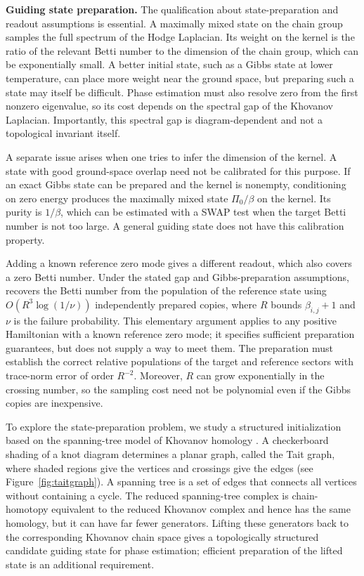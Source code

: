 \documentclass[a4paper,onecolumn,unpublished]{quantumarticle}
\theoremstyle{plain}
\theoremstyle{definition}
\theoremstyle{definition}
\numberwithin{equation}{section}
\begin{document}
\noindent \textbf{Guiding state preparation.}
The qualification about state-preparation and readout assumptions is essential.  A maximally mixed state on the chain group samples the full spectrum of the Hodge Laplacian.    Its weight on the kernel is the ratio of the relevant Betti number to the dimension of the chain group, which can be exponentially small.  A better initial state, such as a Gibbs state at lower temperature, can place more weight near the ground space, but preparing such a state may itself be difficult.  Phase estimation must also resolve zero from the first nonzero eigenvalue, so its cost depends on the spectral gap of the Khovanov Laplacian. Importantly, this spectral gap is diagram-dependent and not a topological invariant itself.

A separate issue arises when one tries to infer the dimension of the kernel.  A state with good ground-space overlap need not be calibrated for this purpose.  If an exact Gibbs state can be prepared and the kernel is nonempty, conditioning on zero energy produces the maximally mixed state \(\Pi_0/\beta\) on the kernel.  Its purity is \(1/\beta\), which can be estimated with a SWAP test when the target Betti number is not too large.  A general guiding state does not have this calibration property.

Adding a known reference zero mode gives a different readout, which also covers a zero Betti number. Under the stated gap and Gibbs-preparation assumptions,  recovers the Betti number from the population of the reference state using $O(R^3\log(1/\nu))$ independently prepared copies, where $R$ bounds $\beta_{i,j}+1$ and $\nu$ is the failure probability. This elementary argument applies to any positive Hamiltonian with a known reference zero mode; it specifies sufficient preparation guarantees, but does not supply a way to meet them. The preparation must establish the correct relative populations of the target and reference sectors with trace-norm error of order $R^{-2}$. Moreover, $R$ can grow exponentially in the crossing number, so the sampling cost need not be polynomial even if the Gibbs copies are inexpensive.  

To explore the state-preparation problem, we study a structured initialization based on the spanning-tree model of Khovanov homology \cite{wehrli2004spanningtree,champanerkar2008spanningtrees}.  A checkerboard shading of a knot diagram determines a planar graph, called the Tait graph, where shaded regions give the vertices and crossings give the edges (see Figure~\ref{fig:taitgraph}).  A spanning tree is a set of edges that connects all vertices without containing a cycle.  The reduced spanning-tree complex is chain-homotopy equivalent to the reduced Khovanov complex and hence has the same homology, but it can have far fewer generators.  Lifting these generators back to the corresponding Khovanov chain space gives a topologically structured candidate guiding state for phase estimation; efficient preparation of the lifted state is an additional requirement.
\end{document}
